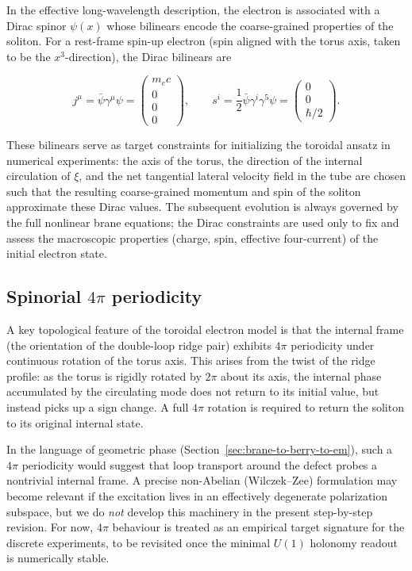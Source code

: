 In the effective long-wavelength description, the electron is associated with a
Dirac spinor $\psi(x)$ whose bilinears encode the coarse-grained properties of
the soliton. For a rest-frame spin-up electron (spin aligned with the torus
axis, taken to be the $x^3$-direction), the Dirac bilinears are

\begin{equation}
j^\mu = \bar\psi \gamma^\mu \psi
= \begin{pmatrix} m_e c \\ 0 \\ 0 \\ 0 \end{pmatrix},
\qquad
s^i = \frac{1}{2} \bar\psi \gamma^i \gamma^5 \psi
= \begin{pmatrix} 0 \\ 0 \\ \hbar/2 \end{pmatrix}.
\label{eq:dirac-rest-bilinears}
\end{equation}

These bilinears serve as target constraints for initializing the toroidal ansatz
in numerical experiments: the axis of the torus, the direction of the internal
circulation of $\xi$, and the net tangential lateral velocity field in the tube
are chosen such that the resulting coarse-grained momentum and spin of the
soliton approximate these Dirac values. The subsequent evolution is always
governed by the full nonlinear brane equations; the Dirac constraints are used
only to fix and assess the macroscopic properties (charge, spin, effective
four-current) of the initial electron state.

\subsection{Spinorial $4\pi$ periodicity}

A key topological feature of the toroidal electron model is that the internal
frame (the orientation of the double-loop ridge pair) exhibits $4\pi$
periodicity under continuous rotation of the torus axis. This arises from the
twist of the ridge profile: as the torus is rigidly rotated by $2\pi$ about its
axis, the internal phase accumulated by the circulating mode does not return to
its initial value, but instead picks up a sign change. A full $4\pi$ rotation is
required to return the soliton to its original internal state.

In the language of geometric phase (Section~\ref{sec:brane-to-berry-to-em}), such a $4\pi$ periodicity would suggest that
loop transport around the defect probes a nontrivial internal frame.
A precise non-Abelian (Wilczek--Zee) formulation may become relevant if the excitation lives in an effectively degenerate
polarization subspace, but we do \emph{not} develop this machinery in the present step-by-step revision.
For now, $4\pi$ behaviour is treated as an empirical target signature for the discrete experiments, to be revisited once the
minimal $U(1)$ holonomy readout is numerically stable.

